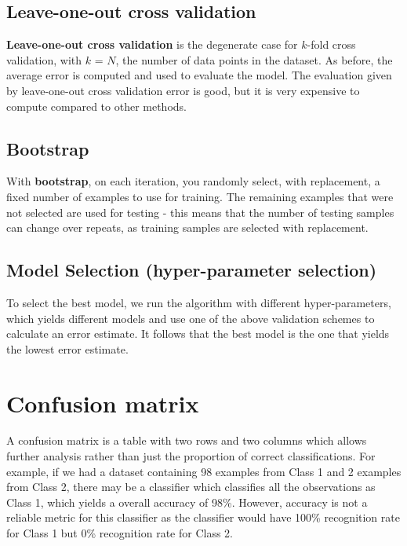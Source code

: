 \documentclass[11pt,fleqn]{book} %
\begin{document}
\newpage
\subsection{Leave-one-out cross validation}
\textbf{Leave-one-out cross validation} is the degenerate case for $k$-fold cross validation, with $k$ = $N$, the number of data points in the dataset. As before, the average error is computed and used to evaluate the model. The evaluation given by leave-one-out cross validation error is good, but it is very expensive to compute compared to other methods.

\subsection{Bootstrap}
With \textbf{bootstrap}, on each iteration, you randomly select, with replacement, a fixed number of examples to use for training. The remaining examples that were not selected are used for testing - this means that the number of testing samples can change over repeats, as training samples are selected with replacement.

\subsection*{Model Selection (hyper-parameter selection)}
To select the best model, we run the algorithm with different hyper-parameters, which yields different models and use one of the above validation schemes to calculate an error estimate. It follows that the best model is the one that yields the lowest error estimate. 

\section{Confusion matrix}
A confusion matrix is a table with two rows and two columns which allows further analysis rather than just the proportion of correct classifications. For example, if we had a dataset containing 98 examples from Class 1 and 2 examples from Class 2, there may be a classifier which classifies all the observations as Class 1, which yields a overall accuracy of 98\%. However, accuracy is not a reliable metric for this classifier as the classifier would have 100\% recognition rate for Class 1 but 0\% recognition rate for Class 2.\\
\end{document}
